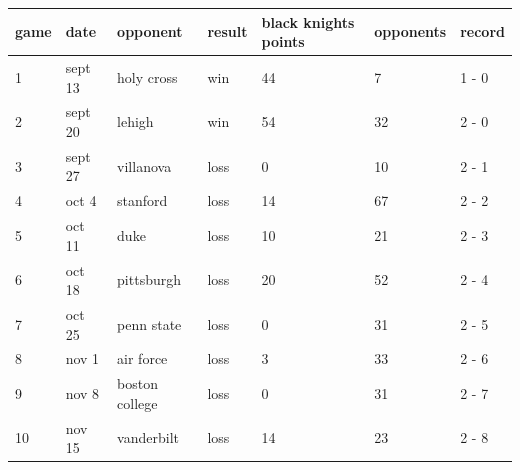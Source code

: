 \documentclass{article}
\begin{document}
\begin{tabular}{lllllll}
\toprule
game & date & opponent & result & black knights points & opponents & record \\
\midrule
1 & sept 13 & holy cross & win & 44 & 7 & 1 - 0 \\
2 & sept 20 & lehigh & win & 54 & 32 & 2 - 0 \\
3 & sept 27 & villanova & loss & 0 & 10 & 2 - 1 \\
4 & oct 4 & stanford & loss & 14 & 67 & 2 - 2 \\
5 & oct 11 & duke & loss & 10 & 21 & 2 - 3 \\
6 & oct 18 & pittsburgh & loss & 20 & 52 & 2 - 4 \\
7 & oct 25 & penn state & loss & 0 & 31 & 2 - 5 \\
8 & nov 1 & air force & loss & 3 & 33 & 2 - 6 \\
9 & nov 8 & boston college & loss & 0 & 31 & 2 - 7 \\
10 & nov 15 & vanderbilt & loss & 14 & 23 & 2 - 8 \\
\bottomrule
\end{tabular}
\end{document}
